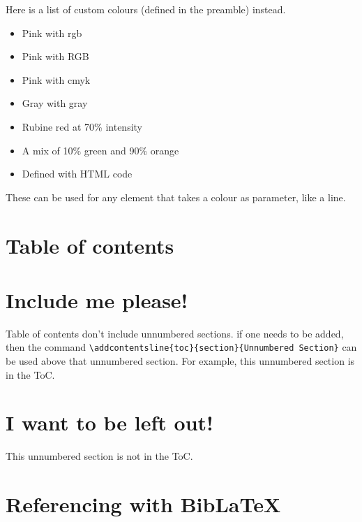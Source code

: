 \documentclass[12pt, letterpaper]{article} %
\begin{document}
Here is a list of custom colours (defined in the preamble) instead.
\begin{itemize}
	\item \textcolor{mypink1}{Pink with rgb}
	\item \textcolor{mypink2}{Pink with RGB}
	\item \textcolor{mypink3}{Pink with cmyk}
	\item \textcolor{mygray}{Gray with gray}
	\item \textcolor{LightRubineRed}{Rubine red at 70\% intensity}
	\item \textcolor{OrangeGreen}{A mix of 10\% green and 90\% orange}
	\item \textcolor{HTMLColor}{Defined with HTML code}
\end{itemize}

These can be used for any element that takes a colour as parameter, like a line.

\noindent {\color{TealBlue} \rule{\linewidth}{1mm}} %

\clearpage
\section{Table of contents}

\tableofcontents


\section*{Include me please!}

Table of contents don't include unnumbered sections. if one needs to be added, then the command \verb+\addcontentsline{toc}{section}{Unnumbered Section}+ can be used above that unnumbered section. For example, this unnumbered section is in the ToC.

\section*{I want to be left out!}

This unnumbered section is not in the ToC.

\clearpage

\section{Referencing with BibLaTeX}
\end{document}
